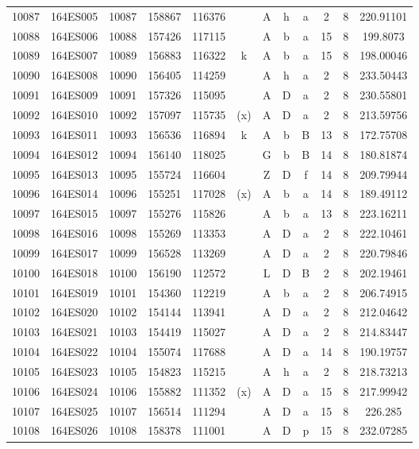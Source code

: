 \begin{tabular}{|*{12}{c|}}
10087 & 164ES005 & 10087 & 158867 & 116376 &  & A & h & a & 2 & 8 & 220.91101 \\ 
10088 & 164ES006 & 10088 & 157426 & 117115 &  & A & b & a & 15 & 8 & 199.8073 \\ 
10089 & 164ES007 & 10089 & 156883 & 116322 & k & A & b & a & 15 & 8 & 198.00046 \\ 
10090 & 164ES008 & 10090 & 156405 & 114259 &  & A & h & a & 2 & 8 & 233.50443 \\ 
10091 & 164ES009 & 10091 & 157326 & 115095 &  & A & D & a & 2 & 8 & 230.55801 \\ 
10092 & 164ES010 & 10092 & 157097 & 115735 & (x) & A & D & a & 2 & 8 & 213.59756 \\ 
10093 & 164ES011 & 10093 & 156536 & 116894 & k & A & b & B & 13 & 8 & 172.75708 \\ 
10094 & 164ES012 & 10094 & 156140 & 118025 &  & G & b & B & 14 & 8 & 180.81874 \\ 
10095 & 164ES013 & 10095 & 155724 & 116604 &  & Z & D & f & 14 & 8 & 209.79944 \\ 
10096 & 164ES014 & 10096 & 155251 & 117028 & (x) & A & b & a & 14 & 8 & 189.49112 \\ 
10097 & 164ES015 & 10097 & 155276 & 115826 &  & A & b & a & 13 & 8 & 223.16211 \\ 
10098 & 164ES016 & 10098 & 155269 & 113353 &  & A & D & a & 2 & 8 & 222.10461 \\ 
10099 & 164ES017 & 10099 & 156528 & 113269 &  & A & D & a & 2 & 8 & 220.79846 \\ 
10100 & 164ES018 & 10100 & 156190 & 112572 &  & L & D & B & 2 & 8 & 202.19461 \\ 
10101 & 164ES019 & 10101 & 154360 & 112219 &  & A & b & a & 2 & 8 & 206.74915 \\ 
10102 & 164ES020 & 10102 & 154144 & 113941 &  & A & D & a & 2 & 8 & 212.04642 \\ 
10103 & 164ES021 & 10103 & 154419 & 115027 &  & A & D & a & 2 & 8 & 214.83447 \\ 
10104 & 164ES022 & 10104 & 155074 & 117688 &  & A & D & a & 14 & 8 & 190.19757 \\ 
10105 & 164ES023 & 10105 & 154823 & 115215 &  & A & h & a & 2 & 8 & 218.73213 \\ 
10106 & 164ES024 & 10106 & 155882 & 111352 & (x) & A & D & a & 15 & 8 & 217.99942 \\ 
10107 & 164ES025 & 10107 & 156514 & 111294 &  & A & D & a & 15 & 8 & 226.285 \\ 
10108 & 164ES026 & 10108 & 158378 & 111001 &  & A & D & p & 15 & 8 & 232.07285 \\ 

\end{tabular}
